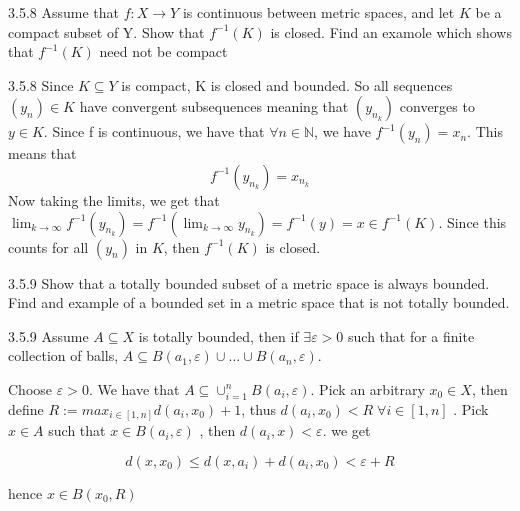 \documentclass[a4paper,norsk]{article}
\renewcommand{\leq}{\leqslant}
\renewcommand{\epsilon}{\varepsilon}
\begin{document}
\begin{oppgavebox}{3.5.8}{}
Assume that $ f : X \rightarrow Y $ is continuous between metric spaces, and let $ K $ be a compact subset of Y. Show that $ f^{-1} (K) $ is closed. Find an examole which shows that $ f^{-1}(K) $ need not be compact

\begin{proofbox}{3.5.8}{}
  Since $ K \subseteq Y $ is compact, K is closed and bounded. So all sequences $ \left( y_n \right) \in K $ have convergent subsequences meaning that $ \left( y_{n_k} \right)  $ converges to $ y \in K $. Since f is continuous, we have that $ \forall n \in \mathbb{N} $, we have $ f^{-1}(y_n) = x_n $. This means that 
  \[
      f^{-1} \left( y_{n_k} \right) = x_{n_k}
  \]
  Now taking the limits, we get that $ \lim_{k \to \infty} f^{-1} \left( y_{n_k} \right) = f^{-1} \left( \lim_{k \to \infty} y_{n_k} \right) = f^{-1} (y) = x \in f^{-1} \left( K \right) $. Since this counts for all $ \left( y_n \right)  $  in $ K $, then $ f^{-1} (K) $ is closed.   
\end{proofbox}
\end{oppgavebox}

\begin{oppgavebox}{3.5.9}{}
Show that a totally bounded subset of a metric space is always bounded. Find and example of a bounded set in a metric space that is not totally bounded.

\begin{proofbox}{3.5.9}{}
  Assume $ A \subseteq X $ is totally bounded, then if $ \exists \epsilon > 0 $ such that for a finite collection of balls,  $ A \subseteq B \left( a_1, \epsilon  \right) \cup ... \cup B \left( a_n, \epsilon  \right)   $. 

  Choose $ \epsilon > 0 $. We have that $ A \subseteq \cup_{i=1}^n B \left( a_i, \epsilon  \right)  $. Pick an arbitrary $ x_0 \in X $, then define $ R := max_{i \in \left[ 1, n \right] } d(a_i, x_0 ) + 1$, thus $ d \left( a_i, x_0 \right) < R \; \forall i \in \left[ 1, n \right]  $ . Pick $ x \in A $ such that $ x \in B \left( a_i, \epsilon  \right)  $ , then $ d(a_i, x) < \epsilon  $. we get
  
  \[
      d \left( x, x_0 \right) \leq d \left( x, a_i \right) + d \left( a_i, x_0 \right) < \epsilon + R
  \]

  hence $ x \in B \left( x_0, R \right)  $ 
  
\end{proofbox}
\end{oppgavebox}
\end{document}
